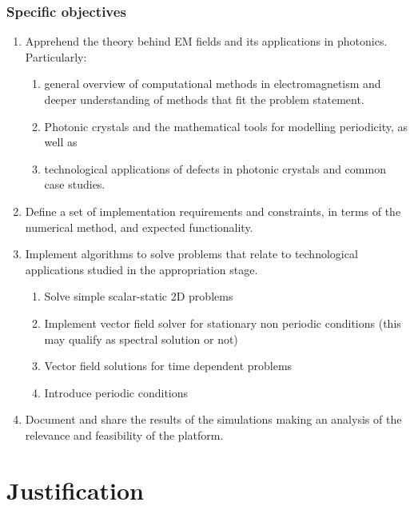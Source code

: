 \subsubsection{Specific objectives}
\begin{enumerate}
\item  Apprehend the theory behind EM fields and its applications in photonics. Particularly: 
\begin{enumerate}
	 \item general overview of computational methods in electromagnetism and deeper understanding of methods that fit the problem statement.
	 \item Photonic crystals and the mathematical tools for modelling periodicity, as well as 
	 \item technological applications of defects in photonic crystals and common case studies. 
\end{enumerate}

\item Define a set of implementation requirements and constraints, in terms of the numerical method, and expected functionality.  

\item Implement algorithms to solve problems that relate to technological applications studied in the appropriation stage. 
	\begin{enumerate}
	\item Solve simple scalar-static 2D problems
	\item Implement vector field solver for stationary non periodic conditions (this may qualify as spectral solution or not)
	\item Vector field solutions for time dependent problems
	\item Introduce periodic conditions
	\end{enumerate}
	
\item Document and share the results of the simulations making an analysis of the relevance and feasibility of the platform. 
\end{enumerate}

\section{Justification}

